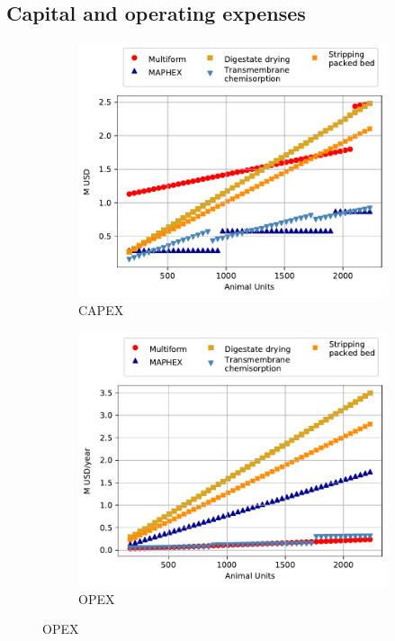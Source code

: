 \begin{refsection}[referencesApD]
\section{Capital and operating expenses}
\begin{figure}[h!]
	\centering 
	\begin{subfigure}[t]{0.8\textwidth}
		\centering
		\includegraphics[width=1\linewidth, trim={0cm 0cm 0cm 0cm},clip]{gfx/AppendixD/EquipCost.pdf} 
		\caption{CAPEX}
		\label{fig:CAPEX}
	\end{subfigure}

	\bigskip

	\begin{subfigure}[t]{0.8\textwidth}
		\centering
		\includegraphics[width=1\linewidth, trim={0cm 0cm 0cm 0cm},clip]{gfx/AppendixD/OpCost.pdf} 
		\caption{OPEX}
		\label{fig:OPEX}
	\end{subfigure}
	

\end{figure}
\end{refsection}
